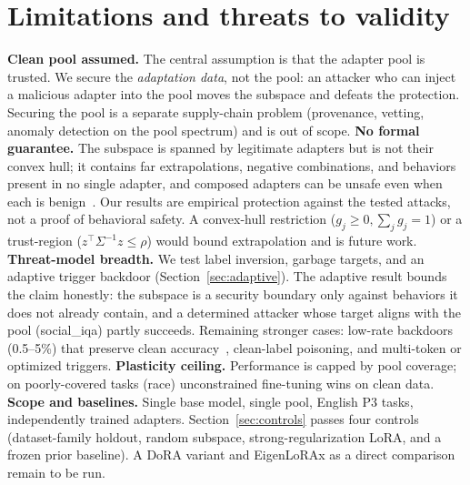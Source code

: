 \documentclass[10pt]{article}
\begin{document}
\section{Limitations and threats to validity}
\label{sec:limits}
\textbf{Clean pool assumed.} The central assumption is that the adapter pool is
trusted. We secure the \emph{adaptation data}, not the pool: an attacker who can
inject a malicious adapter into the pool moves the subspace and defeats the
protection. Securing the pool is a separate supply-chain problem (provenance,
vetting, anomaly detection on the pool spectrum) and is out of scope.
\textbf{No formal guarantee.} The subspace is spanned by legitimate adapters but
is not their convex hull; it contains far extrapolations, negative
combinations, and behaviors present in no single adapter, and composed adapters
can be unsafe even when each is benign~\citep{composition2026}. Our results are
empirical protection against the tested attacks, not a proof of behavioral
safety. A convex-hull restriction ($g_j \ge 0, \sum_j g_j = 1$) or a
trust-region ($z^\top \Sigma^{-1} z \le \rho$) would bound extrapolation and is
future work.
\textbf{Threat-model breadth.} We test label inversion, garbage targets, and an
adaptive trigger backdoor (Section~\ref{sec:adaptive}). The adaptive result
bounds the claim honestly: the subspace is a security boundary only against
behaviors it does not already contain, and a determined attacker whose target
aligns with the pool (social\_iqa) partly succeeds. Remaining stronger cases:
low-rate backdoors (0.5--5\%) that preserve clean
accuracy~\citep{backdoor2024}, clean-label poisoning, and multi-token or
optimized triggers.
\textbf{Plasticity ceiling.} Performance is capped by pool coverage; on
poorly-covered tasks (race) unconstrained fine-tuning wins on clean data.
\textbf{Scope and baselines.} Single base model, single pool, English P3 tasks,
independently trained adapters. Section~\ref{sec:controls} passes four controls
(dataset-family holdout, random subspace, strong-regularization LoRA, and a
frozen prior baseline). A DoRA variant and EigenLoRAx as a direct comparison
remain to be run.
\end{document}
